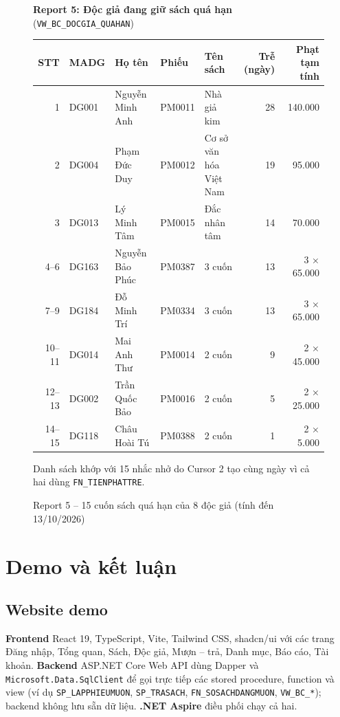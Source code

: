 \documentclass[a4paper,oneside]{report}
\begin{document}
\begin{figure}[!htbp]
\raggedright \textbf{Report 5: Độc giả đang giữ sách quá hạn} (\texttt{VW\_BC\_DOCGIA\_QUAHAN})\par\smallskip
\centering\footnotesize\setlength{\tabcolsep}{4pt}
\begin{tabular}{rllllrr}\toprule
STT & MADG & Họ tên & Phiếu & Tên sách & Trễ (ngày) & Phạt tạm tính\\\midrule
1 & DG001 & Nguyễn Minh Anh & PM0011 & Nhà giả kim & 28 & 140.000\\
2 & DG004 & Phạm Đức Duy & PM0012 & Cơ sở văn hóa Việt Nam & 19 & 95.000\\
3 & DG013 & Lý Minh Tâm & PM0015 & Đắc nhân tâm & 14 & 70.000\\
4–6 & DG163 & Nguyễn Bảo Phúc & PM0387 & 3 cuốn & 13 & 3 × 65.000\\
7–9 & DG184 & Đỗ Minh Trí & PM0334 & 3 cuốn & 13 & 3 × 65.000\\
10–11 & DG014 & Mai Anh Thư & PM0014 & 2 cuốn & 9 & 2 × 45.000\\
12–13 & DG002 & Trần Quốc Bảo & PM0016 & 2 cuốn & 5 & 2 × 25.000\\
14–15 & DG118 & Châu Hoài Tú & PM0388 & 2 cuốn & 1 & 2 × 5.000\\\bottomrule
\end{tabular}
\caption{Report 5 – 15 cuốn sách quá hạn của 8 độc giả (tính đến 13/10/2026)}
\label{fig:r5}
\raggedright\small Danh sách khớp với 15 nhắc nhở do Cursor 2 tạo cùng ngày vì cả hai dùng \texttt{FN\_TIENPHATTRE}.

\end{figure}

\chapter{Demo và kết luận}

\section{Website demo}
\textbf{Frontend} React 19, TypeScript, Vite, Tailwind CSS, shadcn/ui với các trang Đăng nhập, Tổng quan, Sách, Độc giả, Mượn – trả, Danh mục, Báo cáo, Tài khoản. \textbf{Backend} ASP.NET Core Web API dùng Dapper và \texttt{Microsoft.Data.SqlClient} để gọi trực tiếp các stored procedure, function và view (ví dụ \texttt{SP\_LAPPHIEUMUON}, \texttt{SP\_TRASACH}, \texttt{FN\_SOSACHDANGMUON}, \texttt{VW\_BC\_*}); backend không lưu sẵn dữ liệu. \textbf{.NET Aspire} điều phối chạy cả hai.
\end{document}
